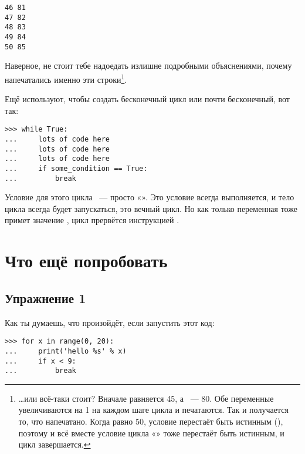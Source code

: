 \begin{listing}
\begin{verbatim}
46 81
47 82
48 83
49 84
50 85
\end{verbatim}
\end{listing}

Наверное, не стоит тебе надоедать излишне подробными объяснениями, почему напечатались именно эти строки\footnote{…или всё-таки стоит? Вначале  равняется 45, а  — 80. Обе переменные увеличиваются на 1 на каждом шаге цикла и печатаются. Так и получается то, что напечатано. Когда  равно 50, условие  перестаёт быть истинным (), поэтому и всё вместе условие цикла «» тоже перестаёт быть истинным, и цикл завершается.}.

Ещё  используют, чтобы создать бесконечный цикл или почти бесконечный, вот так:

\begin{verbatim}
>>> while True:
...     lots of code here
...     lots of code here
...     lots of code here
...     if some_condition == True:
...         break
\end{verbatim}

Условие для этого цикла  — просто «». Это условие всегда выполняется, и тело цикла всегда будет запускаться, это вечный цикл. Но как только переменная  тоже примет значение , цикл прервётся инструкцией .


\section{Что ещё попробовать}


\subsection*{Упражнение 1}
Как ты думаешь, что произойдёт, если запустить этот код:

\begin{listing}
\begin{verbatim}
>>> for x in range(0, 20):
...     print('hello %s' % x)
...     if x < 9:
...         break
\end{verbatim}
\end{listing}


